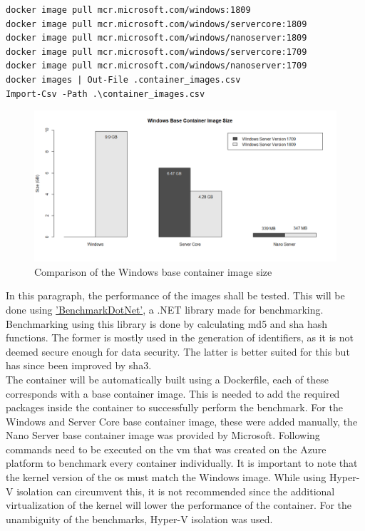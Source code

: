 \begin{lstlisting}[breaklines]
docker image pull mcr.microsoft.com/windows:1809
docker image pull mcr.microsoft.com/windows/servercore:1809
docker image pull mcr.microsoft.com/windows/nanoserver:1809  
docker image pull mcr.microsoft.com/windows/servercore:1709 
docker image pull mcr.microsoft.com/windows/nanoserver:1709   
docker images | Out-File .container_images.csv
Import-Csv -Path .\container_images.csv
\end{lstlisting}

\begin{figure}[h]
	\captionsetup{width=0.8\linewidth}
	\includegraphics[width=0.9\linewidth]{img/Methodologie/Containers0.png}
	\centering
	\caption[Image size comparison]{Comparison of the Windows base container image size}
	\label{fig:Containers}	
\end{figure}

In this paragraph, the performance of the images shall be tested. 
This will be done using \href{https://benchmarkdotnet.org/}{'BenchmarkDotNet'}, a .NET library made for benchmarking. \autocite{Akinshin2019} 
Benchmarking using this library is done by calculating \acrfull{md5} and \acrfull{sha} hash functions. 
The former is mostly used in the generation of identifiers, as it is not deemed secure enough for data security. 
The latter is better suited for this but has since been improved by \acrfull{sha3}. \autocite{Enkov2017}
\\
The container will be automatically built using a Dockerfile, each of these corresponds with a base container image. 
This is needed to add the required packages inside the container to successfully perform the benchmark. 
For the Windows and Server Core base container image, these were added manually, the Nano Server base container image was provided by Microsoft. 
Following commands need to be executed on the \acrshort{vm} that was created on the Azure platform to benchmark every container individually. 
It is important to note that the kernel version of the \acrshort{os} must match the Windows image. 
While using Hyper-V isolation can circumvent this, it is not recommended since the additional virtualization of the kernel will lower the performance of the container. 
For the unambiguity of the benchmarks, Hyper-V isolation was used.

